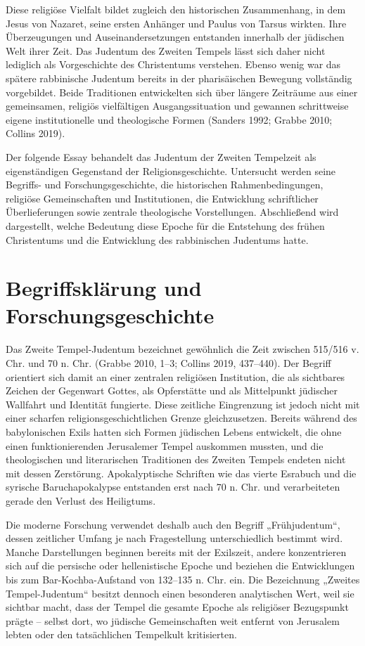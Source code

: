 \documentclass[fontsize=12pt]{mybib}
\begin{document}
Diese religiöse Vielfalt bildet zugleich den historischen Zusammenhang, in dem Jesus von Nazaret, seine ersten Anhänger und Paulus von Tarsus wirkten. Ihre Überzeugungen und Auseinandersetzungen entstanden innerhalb der jüdischen Welt ihrer Zeit. Das Judentum des Zweiten Tempels lässt sich daher nicht lediglich als Vorgeschichte des Christentums verstehen. Ebenso wenig war das spätere rabbinische Judentum bereits in der pharisäischen Bewegung vollständig vorgebildet. Beide Traditionen entwickelten sich über längere Zeiträume aus einer gemeinsamen, religiös vielfältigen Ausgangssituation und gewannen schrittweise eigene institutionelle und theologische Formen (Sanders 1992; Grabbe 2010; Collins 2019).

Der folgende Essay behandelt das Judentum der Zweiten Tempelzeit als eigenständigen Gegenstand der Religionsgeschichte. Untersucht werden seine Begriffs- und Forschungsgeschichte, die historischen Rahmenbedingungen, religiöse Gemeinschaften und Institutionen, die Entwicklung schriftlicher Überlieferungen sowie zentrale theologische Vorstellungen. Abschließend wird dargestellt, welche Bedeutung diese Epoche für die Entstehung des frühen Christentums und die Entwicklung des rabbinischen Judentums hatte.

\section{Begriffsklärung und Forschungsgeschichte}

Das Zweite Tempel-Judentum bezeichnet gewöhnlich die Zeit zwischen 515/516 v. Chr. und 70 n. Chr. (Grabbe 2010, 1–3; Collins 2019, 437–440). Der Begriff orientiert sich damit an einer zentralen religiösen Institution, die als sichtbares Zeichen der Gegenwart Gottes, als Opferstätte und als Mittelpunkt jüdischer Wallfahrt und Identität fungierte. Diese zeitliche Eingrenzung ist jedoch nicht mit einer scharfen religionsgeschichtlichen Grenze gleichzusetzen. Bereits während des babylonischen Exils hatten sich Formen jüdischen Lebens entwickelt, die ohne einen funktionierenden Jerusalemer Tempel auskommen mussten, und die theologischen und literarischen Traditionen des Zweiten Tempels endeten nicht mit dessen Zerstörung. Apokalyptische Schriften wie das vierte Esrabuch und die syrische Baruchapokalypse entstanden erst nach 70 n. Chr. und verarbeiteten gerade den Verlust des Heiligtums.

Die moderne Forschung verwendet deshalb auch den Begriff „Frühjudentum“, dessen zeitlicher Umfang je nach Fragestellung unterschiedlich bestimmt wird. Manche Darstellungen beginnen bereits mit der Exilszeit, andere konzentrieren sich auf die persische oder hellenistische Epoche und beziehen die Entwicklungen bis zum Bar-Kochba-Aufstand von 132–135 n. Chr. ein. Die Bezeichnung „Zweites Tempel-Judentum“ besitzt dennoch einen besonderen analytischen Wert, weil sie sichtbar macht, dass der Tempel die gesamte Epoche als religiöser Bezugspunkt prägte – selbst dort, wo jüdische Gemeinschaften weit entfernt von Jerusalem lebten oder den tatsächlichen Tempelkult kritisierten.
\end{document}
